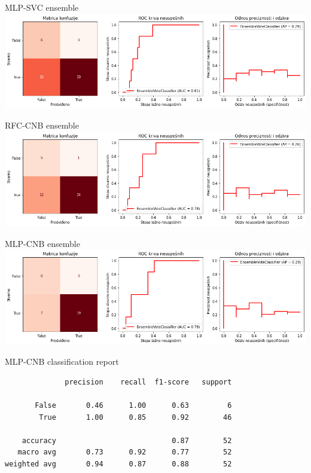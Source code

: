 \documentclass[hyperref={bookmarks=false}]{beamer}
\begin{document}
\begin{frame}{MLP-SVC ensemble}
\includegraphics[width=\textwidth]{mlpsvc.png}
\end{frame}

\begin{frame}{RFC-CNB ensemble}
\includegraphics[width=\textwidth]{forcnb.png}
\end{frame}

\begin{frame}{MLP-CNB ensemble}
\includegraphics[width=\textwidth]{mlpcnb.png}
\end{frame}

\begin{frame}[fragile]{MLP-CNB classification report}
\begin{lstlisting}
              precision    recall  f1-score   support

       False       0.46      1.00      0.63         6
        True       1.00      0.85      0.92        46

    accuracy                           0.87        52
   macro avg       0.73      0.92      0.77        52
weighted avg       0.94      0.87      0.88        52
\end{lstlisting}
\end{frame}
\end{document}
